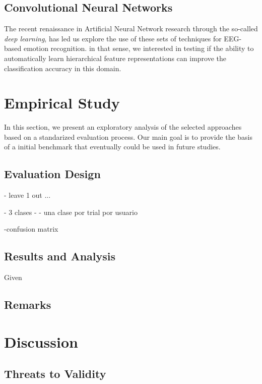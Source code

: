 \documentclass{sig-alternate}
\begin{document}
\subsection{Convolutional Neural Networks}

The recent renaissance in Artificial Neural Network research 
through the so-called \emph{deep learning}, has led us explore 
the use of these sets of techniques for EEG-based emotion 
recognition. in that sense, we interested in testing if the ability
to automatically learn  hierarchical feature representations can
improve the classification accuracy in this domain. 

\cite{lecun1995convolutional}
\cite{zheng2014time}
\cite{stober2014using}
\cite{stober2014classifying}
\cite{xing2010brief}

\section{Empirical Study}
\label{study}

In this section, we present an  exploratory 
analysis of the selected approaches based on a standarized
evaluation process. Our main goal is to provide the basis
of a initial benchmark that eventually could be used in future
studies.

\subsection{ Evaluation Design} 


- leave 1 out ...

- 3 clases
 - 
- una clase por trial por  usuario

-confusion matrix 

\subsection{ Results and Analysis}

Given 



\subsection{Remarks}

\section{Discussion}
\label{discussion}

\subsection{Threats to Validity}
\end{document}
